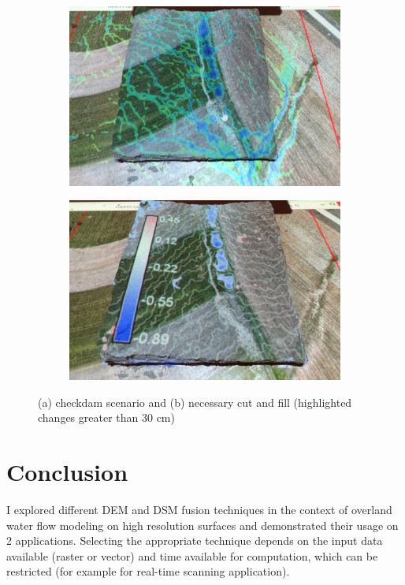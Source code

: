 \documentclass[a4paper,10pt]{article}
\begin{document}
\begin{figure}
	\centering
	\begin{subfigure}[b]{0.499\textwidth}
 		\includegraphics[width=\textwidth]{img/flow2}
 		\caption{}
	\end{subfigure}\hfill%
	\begin{subfigure}[b]{0.499\textwidth}
 		\includegraphics[width=\textwidth]{img/diff2}
 		\caption{}
	\end{subfigure}\hfill%
	\caption{(a) checkdam scenario  and (b) necessary cut and fill (highlighted 
	changes greater than 30 cm)}
	\label{fig:diff2}
\end{figure}

\section*{Conclusion}
I explored different  DEM and DSM fusion techniques in the context of overland water flow 
modeling on high resolution surfaces and demonstrated their usage on 2 applications.
Selecting the appropriate technique depends on the input data available (raster or vector)
and time available for computation, which can be restricted 
(for example for real-time scanning application).

 
\end{document}
